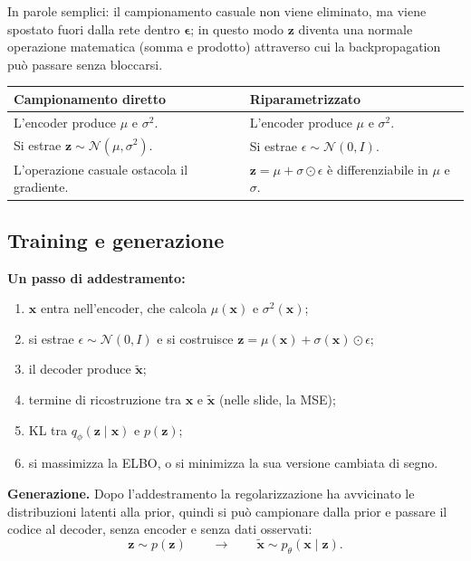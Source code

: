 \documentclass[11pt,a4paper]{article}
\providecommand{\Normal}{\mathcal{N}}
\begin{document}
In parole semplici: il campionamento casuale non viene eliminato, ma viene spostato fuori dalla rete dentro 
$\boldsymbol{\epsilon}$; in questo modo $\mathbf{z}$ diventa una normale operazione matematica (somma e prodotto)
 attraverso cui la backpropagation può passare senza bloccarsi.

\begin{center}
\renewcommand{\arraystretch}{1.35}
\begin{tabular}{|p{6.9cm}|p{6.9cm}|}
\hline
\textbf{Campionamento diretto} & \textbf{Riparametrizzato} \\
\hline
L'encoder produce $\mu$ e $\sigma^2$. & L'encoder produce $\mu$ e $\sigma^2$. \\
\hline
Si estrae $\mathbf{z}\sim\Normal(\mu,\sigma^2)$. & Si estrae $\epsilon\sim\Normal(0,I)$. \\
\hline
L'operazione casuale ostacola il gradiente. & $\mathbf{z}=\mu+\sigma\odot\epsilon$ è differenziabile in $\mu$ e $\sigma$. \\
\hline
\end{tabular}
\end{center}

\subsection{Training e generazione}

\textbf{Un passo di addestramento:}
\begin{enumerate}
  \item $\mathbf{x}$ entra nell'encoder, che calcola $\mu(\mathbf{x})$ e $\sigma^2(\mathbf{x})$;
  \item si estrae $\epsilon\sim\Normal(0,I)$ e si costruisce
        $\mathbf{z}=\mu(\mathbf{x})+\sigma(\mathbf{x})\odot\epsilon$;
  \item il decoder produce $\widetilde{\mathbf{x}}$;
  \item termine di ricostruzione tra $\mathbf{x}$ e $\widetilde{\mathbf{x}}$
        (nelle slide, la MSE);
  \item KL tra $q_\phi(\mathbf{z}\mid\mathbf{x})$ e $p(\mathbf{z})$;
  \item si massimizza la ELBO, o si minimizza la sua versione cambiata di segno.
\end{enumerate}

\textbf{Generazione.} Dopo l'addestramento la regolarizzazione ha avvicinato le
distribuzioni latenti alla prior, quindi si può campionare dalla prior e
passare il codice al decoder, senza encoder e senza dati osservati:
\[
\mathbf{z}\sim p(\mathbf{z})\qquad\longrightarrow\qquad\widetilde{\mathbf{x}}\sim p_\theta(\mathbf{x}\mid\mathbf{z}).
\]
\end{document}
